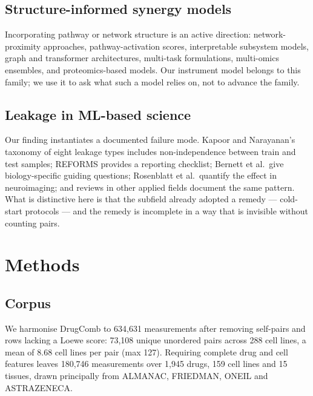 \documentclass{ws-procs11x85}
\begin{document}
\subsection{Structure-informed synergy models}

Incorporating pathway or network structure is an active direction:
network-proximity approaches,\cite{cheng2019} pathway-activation
scores,\cite{trac2025} interpretable subsystem models,\cite{kuenzi2020} graph and
transformer architectures,\cite{alam2024,kuru2022,sherine2025} multi-task
formulations,\cite{chen2023,wang2023} multi-omics
ensembles,\cite{preto2022,lin2023} and proteomics-based
models.\cite{boonyarit2025} Our instrument model belongs to this family; we use
it to ask what such a model relies on, not to advance the family.

\subsection{Leakage in ML-based science}

Our finding instantiates a documented failure mode. Kapoor and Narayanan's
taxonomy of eight leakage types includes non-independence between train and test
samples;\cite{kapoor2023,kapoor2022} REFORMS provides a reporting
checklist;\cite{kapoor2024} Bernett et al.\ give biology-specific guiding
questions;\cite{bernett2024} Rosenblatt et al.\ quantify the effect in
neuroimaging;\cite{rosenblatt2024} and reviews in other applied fields document
the same pattern.\cite{zhu2023,semmelrock2024} What is distinctive here is that
the subfield already adopted a remedy --- cold-start protocols --- and the remedy
is incomplete in a way that is invisible without counting pairs.

\section{Methods}

\subsection{Corpus}

We harmonise DrugComb\cite{zagidullin2019} to 634,631 measurements after removing
self-pairs and rows lacking a Loewe score: 73,108 unique unordered pairs across
288 cell lines, a mean of 8.68 cell lines per pair (max 127). Requiring complete
drug and cell features leaves 180,746 measurements over 1,945 drugs, 159 cell
lines and 15 tissues, drawn principally from ALMANAC, FRIEDMAN, ONEIL and
ASTRAZENECA.
\end{document}
